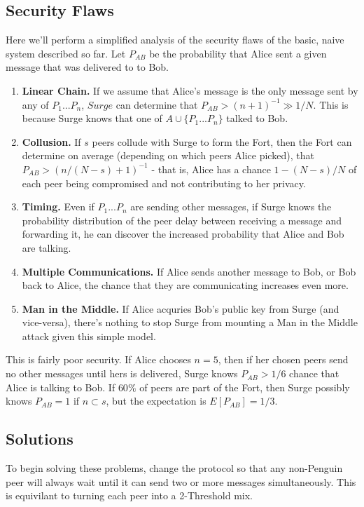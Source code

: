 \documentclass[twocolumn]{paper}
\begin{document}
\subsection{Security Flaws}
Here we'll perform a simplified analysis of the security flaws of the basic, naive system described so far. 
Let $P_{AB}$ be the probability that Alice sent a given message that was delivered to to Bob. 
\begin{enumerate}
\item\textbf{Linear Chain.} If we assume that Alice's message is the only message sent by any of $P_1 ... P_n$, $Surge$ can determine that $P_{AB} > (n+1)^{-1} \gg 1/N$. This is because Surge knows that one of $A \cup \{P_1 ... P_n\}$ talked to Bob.
\item\textbf{Collusion.} If  $s$ peers collude with Surge to form the Fort, then the Fort can determine on average (depending on which peers Alice picked), that $P_{AB} > (n/(N-s)+1)^{-1}$ - that is, Alice has a chance $1 - (N-s)/N$ of each peer being compromised and not contributing to her privacy.
\item\textbf{Timing.} Even if $P_1 ... P_n$ are sending other messages, if Surge knows the probability distribution of the peer delay between receiving a message and forwarding it, he can discover the increased probability that Alice and Bob are talking. 
\item\textbf{Multiple Communications.} If Alice sends another message to Bob, or Bob back to Alice, the chance that they are communicating increases even more. 
\item\textbf{Man in the Middle.} If Alice acquries Bob's public key from Surge (and vice-versa), there's nothing to stop Surge from mounting a Man in the Middle attack given this simple model. 
\end{enumerate}
This is fairly poor security. If Alice chooses $n = 5$, then if her chosen peers send no other messages until hers is delivered, Surge knows $P_{AB} > 1/6$ chance that Alice is talking to Bob. If $60\%$ of peers are part of the Fort, then Surge possibly knows $P_{AB} = 1$ if $n \subset s$, but the expectation is $E[P_{AB}] = 1/3$.

\subsection{Solutions}
To begin solving these problems, change the protocol so that any non-Penguin peer will always wait until it can send two or more messages simultaneously. This is equivilant to turning each peer into a 2-Threshold mix. \cite{TODO}
\end{document}
